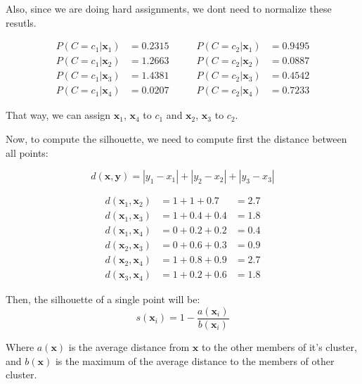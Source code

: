 \documentclass[12pt]{article}
\begin{document}
\begin{enumerate}[leftmargin=\labelsep]
    Also, since we are doing hard assignments, we dont need to normalize these resutls.

    \begin{equation}
    \begin{aligned}
        P(C = c_1 | \mathbf{x}_1) &= 0.2315 &\qquad P(C = c_2 | \mathbf{x}_1) &= 0.9495 \\
        P(C = c_1 | \mathbf{x}_2) &= 1.2663 &\qquad P(C = c_2 | \mathbf{x}_2) &= 0.0887 \\
        P(C = c_1 | \mathbf{x}_3) &= 1.4381 &\qquad P(C = c_2 | \mathbf{x}_3) &= 0.4542 \\
        P(C = c_1 | \mathbf{x}_4) &= 0.0207 &\qquad P(C = c_2 | \mathbf{x}_4) &= 0.7233
    \end{aligned}
    \end{equation}

    That way, we can assign $\mathbf{x}_1$, $\mathbf{x}_4$ to $c_1$ and $\mathbf{x}_2$, $\mathbf{x}_3$ to $c_2$.

    Now, to compute the silhouette, we need to compute first the distance between all points:

    \begin{equation}
        d(\mathbf{x}, \mathbf{y}) = |y_1 - x_1| + |y_2 - x_2| + |y_3 - x_3|
    \end{equation}

    \begin{equation}
    \begin{aligned}
        d(\mathbf{x}_1, \mathbf{x}_2) &= 1 + 1   + 0.7 &= 2.7 \\
        d(\mathbf{x}_1, \mathbf{x}_3) &= 1 + 0.4 + 0.4 &= 1.8 \\
        d(\mathbf{x}_1, \mathbf{x}_4) &= 0 + 0.2 + 0.2 &= 0.4 \\
        d(\mathbf{x}_2, \mathbf{x}_3) &= 0 + 0.6 + 0.3 &= 0.9 \\
        d(\mathbf{x}_2, \mathbf{x}_4) &= 1 + 0.8 + 0.9 &= 2.7 \\
        d(\mathbf{x}_3, \mathbf{x}_4) &= 1 + 0.2 + 0.6 &= 1.8
    \end{aligned}
    \end{equation}

    Then, the silhouette of a single point will be:
    \begin{equation}
        s(\mathbf{x}_i) = 1 - \frac{a(\mathbf{x}_i)}{b(\mathbf{x}_i)}
    \end{equation}

    Where $a(\mathbf{x})$ is the average distance from $\mathbf{x}$ to the other members of it's cluster, and $b(\mathbf{x})$ is the maximum of the average distance to the members of other cluster.


\end{enumerate}
\end{document}
